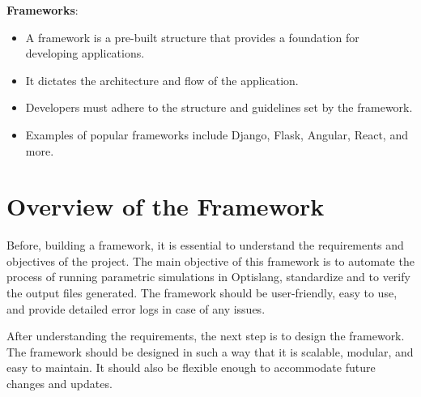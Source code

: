 \textbf{Frameworks}:
\begin{itemize}
    \item A framework is a pre-built structure that provides a foundation for developing applications.
    \item It dictates the architecture and flow of the application.
    \item Developers must adhere to the structure and guidelines set by the framework.
    \item Examples of popular frameworks include Django, Flask, Angular, React, and more. \newline
\end{itemize}

\section{Overview of the Framework}

Before, building a framework, it is essential to understand the requirements and objectives of the project. The main objective of this framework is to 
automate the process of running parametric simulations in Optislang, standardize and to verify the output files generated. The framework should be user-friendly,
easy to use, and provide detailed error logs in case of any issues.

After understanding the requirements, the next step is to design the framework. The framework should be designed in such a way that it is scalable,
modular, and easy to maintain. It should also be flexible enough to accommodate future changes and updates. 

